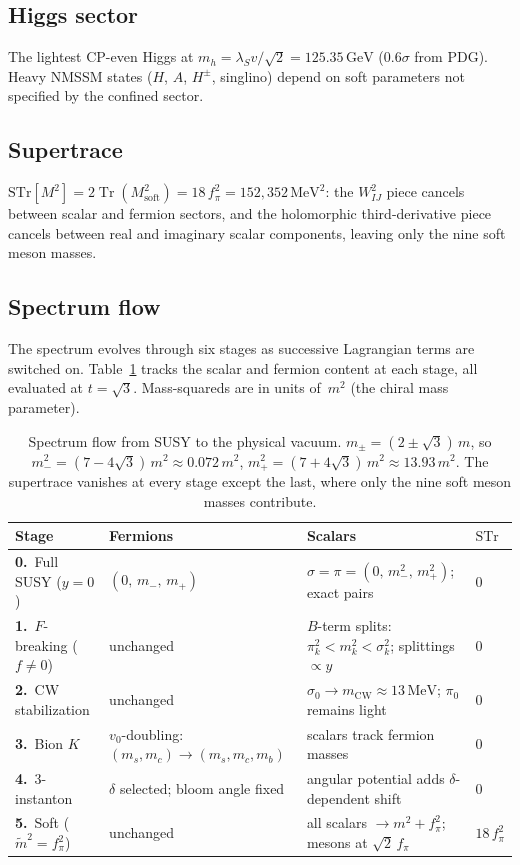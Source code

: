 \documentclass[12pt,a4paper]{article}
\newcommand{\MeV}{\,\text{MeV}}
\newcommand{\GeV}{\,\text{GeV}}
\newcommand{\fpi}{f_\pi}
\begin{document}
\subsection{Higgs sector}

The lightest CP-even Higgs at $m_h = \lambda_S v/\sqrt{2} = 125.35\GeV$
($0.6\sigma$ from PDG). Heavy NMSSM states ($H$, $A$, $H^\pm$, singlino)
depend on soft parameters not specified by the confined sector.

\subsection{Supertrace}

$\text{STr}[M^2] = 2\operatorname{Tr}(M^2_{\text{soft}})
= 18\,\fpi^2 = 152{,}352\MeV^2$:
the $W_{IJ}^2$ piece cancels between scalar and fermion sectors,
and the holomorphic third-derivative piece cancels between real
and imaginary scalar components, leaving only the nine
soft meson masses.

\subsection{Spectrum flow}

The spectrum evolves through six stages as successive Lagrangian
terms are switched on. Table~\ref{tab:flow} tracks the scalar
and fermion content at each stage, all evaluated at $t = \sqrt{3}$.
Mass-squareds are in units of~$m^2$ (the chiral mass parameter).

\begin{table}[ht]
\centering
\small
\begin{tabular}{p{3.0cm}p{3.8cm}p{4.8cm}l}
\toprule
Stage & Fermions & Scalars & $\mathrm{STr}$ \\
\midrule
\textbf{0.}~Full SUSY ($y=0$)
  & $(0,\, m_-,\, m_+)$
  & $\sigma = \pi = (0,\, m_-^2,\, m_+^2)$; exact pairs
  & $0$ \\[4pt]
\textbf{1.}~$F$-breaking ($f\neq 0$)
  & unchanged
  & $B$-term splits: $\pi_k^2 < m_k^2 < \sigma_k^2$; splittings $\propto y$
  & $0$ \\[4pt]
\textbf{2.}~CW stabilization
  & unchanged
  & $\sigma_0 \to m_{\text{CW}} \approx 13\MeV$; $\pi_0$ remains light
  & $0$ \\[4pt]
\textbf{3.}~Bion $K$
  & $v_0$-doubling: $(m_s,m_c) \to (m_s,m_c,m_b)$
  & scalars track fermion masses
  & $0$ \\[4pt]
\textbf{4.}~3-instanton
  & $\delta$ selected; bloom angle fixed
  & angular potential adds $\delta$-dependent shift
  & $0$ \\[4pt]
\textbf{5.}~Soft ($\tilde m^2 = \fpi^2$)
  & unchanged
  & all scalars $\to m^2 + \fpi^2$; mesons at $\sqrt{2}\,\fpi$
  & $18\,\fpi^2$ \\
\bottomrule
\end{tabular}
\caption{Spectrum flow from SUSY to the physical vacuum.
$m_\pm = (2 \pm \sqrt{3})\,m$, so
$m_-^2 = (7{-}4\sqrt{3})\,m^2 \approx 0.072\,m^2$,
$m_+^2 = (7{+}4\sqrt{3})\,m^2 \approx 13.93\,m^2$.
The supertrace vanishes at every stage except the last, where
only the nine soft meson masses contribute.}
\label{tab:flow}
\end{table}
\end{document}
